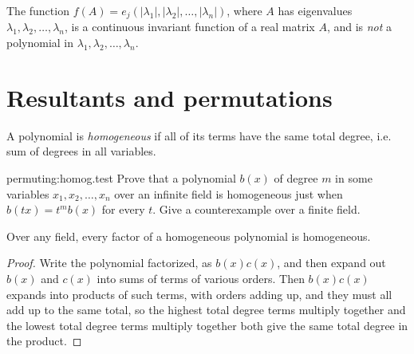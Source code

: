 \begin{example}
The function \(f(A)=e_j\left(\left|\lambda_1\right|,\left|\lambda_2\right|,\dots,\left|\lambda_n\right|\right)\), where \(A\) has eigenvalues \(\lambda_1, \lambda_2, \dots, \lambda_n\), is a continuous invariant function of a real matrix \(A\), and is \emph{not} a polynomial in \(\lambda_1, \lambda_2, \dots, \lambda_n\).
\end{example}







\section{Resultants and permutations}

A polynomial is \emph{homogeneous} if all of its terms have the same total degree, i.e. sum of degrees in all variables.

\begin{problem}{permuting:homog.test}
Prove that a polynomial \(b(x)\) of degree \(m\) in some variables \(x_1,x_2,\dots,x_n\) over an infinite field is homogeneous just when \(b(tx)=t^mb(x)\) for every \(t\).
Give a counterexample over a finite field.
\end{problem}

\begin{lemma}
Over any field, every factor of a homogeneous polynomial is homogeneous.
\end{lemma}
\begin{proof}
Write the polynomial factorized, as
\(
b(x)c(x)
\),
and then expand out \(b(x)\) and \(c(x)\) into sums of terms of various orders.
Then \(b(x)c(x)\) expands into products of such terms, with orders adding up, and they must all add up to the same total, so the highest total degree terms multiply together and the lowest total degree terms multiply together both give the same total degree in the product.
\end{proof}

